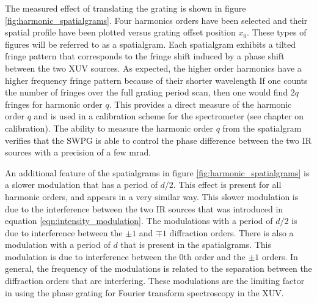 The measured effect of translating the grating is shown in figure \ref{fig:harmonic_spatialgrams}. Four harmonics orders have been selected and their spatial profile have been plotted versus grating offset position $x_0$.  These types of figures will be referred to as a spatialgram. Each spatialgram exhibits a tilted fringe pattern that corresponds to the fringe shift induced by a phase shift between the two XUV sources.  As expected, the higher order harmonics have a higher frequency fringe pattern because of their shorter wavelength  If one counts the number of fringes over the full grating period scan, then one would find $2q$ fringes for harmonic order $q$. This provides a direct measure of the harmonic order $q$ and is used in a calibration scheme for the spectrometer (see chapter on calibration).  The ability to measure the harmonic order $q$ from the spatialgram verifies that the SWPG is able to control the phase difference between the two IR sources with a precision of a few mrad.

An additional feature of the spatialgrams in figure \ref{fig:harmonic_spatialgrams} is a slower modulation that has a period of $d/2$.  This effect is present for all harmonic orders, and appears in a very similar way.  This slower modulation is due to the interference between the two IR sources that was introduced in equation \ref{eqn:intensity_modulation}.  The modulations with a period of $d/2$ is due to interference between the $\pm1$ and $\mp1$ diffraction orders.  There is also a modulation with a period of $d$ that is present in the spatialgrams.  This modulation is due to interference between the 0th order and the $\pm1$ orders.  In general, the frequency of the modulations is related to the separation between the diffraction orders that are interfering.  These modulations are the limiting factor in using the phase grating for Fourier transform spectroscopy in the XUV.

